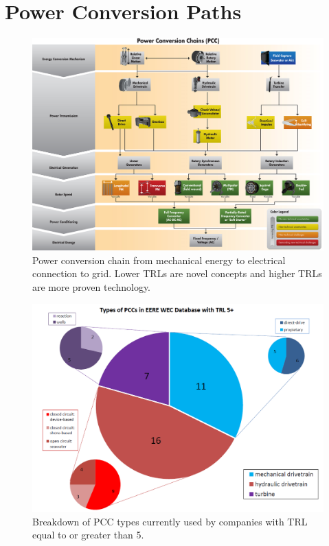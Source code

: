 \documentclass[conference]{IEEEtran}
\begin{document}
\section{Power Conversion Paths}

\begin{figure}[t] 
    \centering
    \includegraphics[width=1.95\columnwidth]{Images/PCC}
    \caption{Power conversion chain from mechanical energy to electrical connection to grid. Lower TRLs are novel concepts and higher TRLs are more proven technology.}
    \end{figure}

\begin{figure}[t]
    \centering
    \includegraphics[width=1\columnwidth]{Images/TRL}
    \caption{Breakdown of PCC types currently used by companies with TRL equal to or greater than 5.}
    \end{figure}
\end{document}
